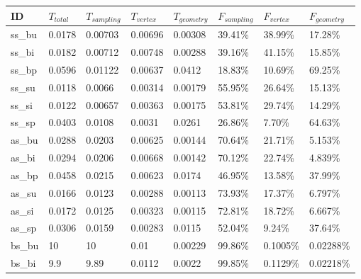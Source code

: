 \documentclass[]{article}
\begin{document}
\pagebreak

\begin{table}[htb]
\centering
\begin{tabular}{|l|l|l|l|l|l|l|l|}
\hline
ID     & $T_{total}$ & $T_{sampling}$ & $T_{vertex}$ & $T_{geometry}$ & $F_{sampling}$ & $F_{vertex}$ & $F_{geometry}$ \\ \hline
ss\_bu & 0.0178      & 0.00703        & 0.00696      & 0.00308        & 39.41\%        & 38.99\%      & 17.28\%        \\ \hline
ss\_bi & 0.0182      & 0.00712        & 0.00748      & 0.00288        & 39.16\%        & 41.15\%      & 15.85\%        \\ \hline
ss\_bp & 0.0596      & 0.01122        & 0.00637      & 0.0412         & 18.83\%        & 10.69\%      & 69.25\%        \\ \hline
ss\_su & 0.0118      & 0.0066         & 0.00314      & 0.00179        & 55.95\%        & 26.64\%      & 15.13\%        \\ \hline
ss\_si & 0.0122      & 0.00657        & 0.00363      & 0.00175        & 53.81\%        & 29.74\%      & 14.29\%        \\ \hline
ss\_sp & 0.0403      & 0.0108         & 0.0031       & 0.0261         & 26.86\%        & 7.70\%       & 64.63\%        \\ \hline
as\_bu & 0.0288      & 0.0203         & 0.00625      & 0.00144        & 70.64\%        & 21.71\%      & 5.153\%        \\ \hline
as\_bi & 0.0294      & 0.0206         & 0.00668      & 0.00142        & 70.12\%        & 22.74\%      & 4.839\%        \\ \hline
as\_bp & 0.0458      & 0.0215         & 0.00623      & 0.0174         & 46.95\%        & 13.58\%      & 37.99\%        \\ \hline
as\_su & 0.0166      & 0.0123         & 0.00288      & 0.00113        & 73.93\%        & 17.37\%      & 6.797\%        \\ \hline
as\_si & 0.0172      & 0.0125         & 0.00323      & 0.00115        & 72.81\%        & 18.72\%      & 6.667\%        \\ \hline
as\_sp & 0.0306      & 0.0159         & 0.00283      & 0.0115         & 52.04\%        & 9.24\%       & 37.64\%        \\ \hline
bs\_bu & 10          & 10             & 0.01         & 0.00229        & 99.86\%        & 0.1005\%     & 0.02288\%      \\ \hline
bs\_bi & 9.9         & 9.89           & 0.0112       & 0.0022         & 99.85\%        & 0.1129\%     & 0.02218\%      \\ \hline

\end{tabular}
\end{table}
\end{document}
